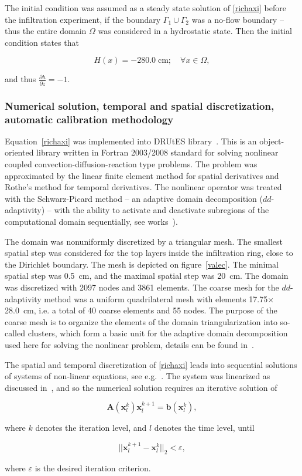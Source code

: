 \documentclass[review]{myarticle}
\newenvironment{lineq}
    {\begin{linenomath*}
    \begin{equation}
    }
    { 
    \end{equation} 
    \end{linenomath*}
    }
\renewcommand{\vec}{\mathbf}
\begin{document}
The initial condition was assumed as a steady state solution  of \eqref{richaxi}  before the infiltration experiment, if the boundary $\Gamma_1 \cup \Gamma_2$ was a no-flow boundary -- thus the entire domain $\Omega$ was considered in a hydrostatic state.  Then the initial condition states that 
\begin{lineq}
H(x) = -280.0 \; \mbox{cm}; \quad \forall x \in \Omega,
\end{lineq}
and thus $\frac{\partial h}{\partial z} = -1$.


\subsubsection{Numerical solution, temporal and spatial discretization, automatic calibration methodology}%
\label{trapoty}

Equation~\eqref{richaxi} was implemented into DRUtES library~\citep{drutes, mojeamc}. This is an object-oriented library written in Fortran 2003/2008 standard for solving nonlinear coupled convection-diffusion-reaction type problems. The problem was approximated by the linear finite element method for spatial derivatives and Rothe's method for temporal derivatives. The nonlinear operator was treated with the Schwarz-Picard method -- an adaptive domain decomposition  ($dd$-adaptivity) -- with the ability to activate and deactivate subregions of the computational domain sequentially, see works~\citep{mojecomp, mojejcam2, mojeamc2}).



 The domain was nonuniformly discretized by a triangular mesh. The smallest spatial step was considered for the top layers inside the infiltration ring, close to the Dirichlet boundary. The mesh is depicted on figure~\ref{valec}. The minimal spatial step was 0.5~cm, and the maximal spatial step was 20~cm. The domain was discretized with 2097 nodes and 3861 elements. The coarse mesh for the $dd$-adaptivity method was a uniform quadrilateral mesh with elements 17.75$\times$28.0~cm, i.e. a total of 40 coarse elements and 55 nodes. The purpose of the coarse mesh is to organize the elements of the domain triangularization into so-called clusters, which form a basic unit for the adaptive domain decomposition used here for solving the nonlinear problem, details can be found in~\citep{mojeamc2}.

 
 The spatial and temporal discretization of \eqref{richaxi} leads into sequential solutions of systems of non-linear equations, see e.g.~\citep{mojecomp}. The system was linearized as discussed in~\citep{mojeacta, mojeamc}, and so the numerical solution requires an iterative solution of 
\begin{lineq}
\label{matice}
\mathbf{A}(\vec{x}_l^k) \vec{x}_l^{k+1} = \vec{b}(\vec{x}_l^k),
\end{lineq}
where $k$ denotes the iteration level, and $l$ denotes the time level, until \begin{lineq} \label{picard} ||\vec{x}_l^{k+1} - \vec{x}_l^k||_2 < \varepsilon , \end{lineq} where $\varepsilon$ is the desired iteration criterion.
\end{document}
